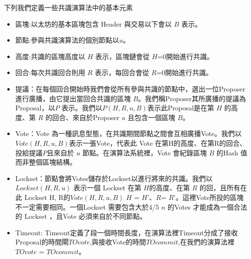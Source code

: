 %
下列我們定義一些共識演算法中的基本元素 
\begin{itemize}%
\item  區塊:以太坊的基本區塊包含 Header 與交易以下會以 $B$ 表示。
\item  節點:參與共識演算法的個別節點以$u$。
\item  高度:共識的區塊高度以 $H$ 表示，區塊鏈會從 $H$=0開始進行共識。
\item  回合:每次共識回合則用 $R$ 表示，每回合會從 $R$=0開始進行共識。
\item  提議：在每個回合開始時我們會從所有參與共識的節點中，選出一位Proposer進行廣播，由它提出當回合共識的區塊 $B$。我們稱Proposer其所廣播的提議為Proposal，以$P$ 表示。我們以$P(H,R,u,B)$表示此Proposal是在第 $H$ 的高度、第 $R$ 的回合、來自於Proposer $u$ 且包含一個區塊 $B$。
\item  Vote：Vote 為一種訊息型態，在共識期間節點之間會互相廣播Vote。我們以 $Vote(H,R,u,B)$表示一張Vote，代表此 Vote 在第H的高度、在第R的回合、投給提議$P$且來自於 $u$ 節點。在演算法系統裡，Vote 會紀錄區塊 $B$ 的Hash 值而非整個區塊結構。

\item  Lockset：節點會將Votes儲存於Lockset以進行將來的共識。我們以$Lockset(H,R,u)$ 表示一個 Lockset 在第 $H$的高度、在第 $R$ 的回，且所有在此 Lockset H, R的$Vote(H,R,u,B)$ $H$ = $H’$、$R$= $R’$。這裡Vote所投的區塊不一定需要相同。一個Lockset 需要包含大於4/5 $n$ 的Votes 才能成為⼀個合法的 Lockset ，且Vote 必須來自於不同節點。
\item Timeout: Timeout定義了段一個時間長度，在演算法裡Timeout分成了接收Proposal的時間閘$TOvote$,與接收Vote的時間$TOcommit$,在我們的演算法裡$TOvote$ = $TOcommit$。 

\end{itemize}